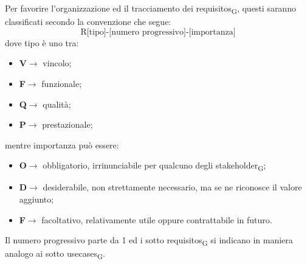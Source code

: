                 Per favorire l'organizzazione ed il tracciamento dei \glspl{requisito}\textsubscript{G}, questi saranno classificati secondo la convenzione che segue:
                $$\text{R[tipo]-[numero progressivo]-[importanza]}$$
                dove tipo è uno tra:
                \begin{itemize}
                    \item \textbf{V}$\rightarrow$ vincolo;
                    \item \textbf{F}$\rightarrow$ funzionale;
                    \item \textbf{Q}$\rightarrow$ qualità;
                    \item \textbf{P}$\rightarrow$ prestazionale;
                \end{itemize}
                mentre importanza può essere:
                \begin{itemize}
                    \item \textbf{O}$\rightarrow$ obbligatorio, irrinunciabile per qualcuno degli \gls{stakeholder}\textsubscript{G};
                    \item \textbf{D}$\rightarrow$ desiderabile, non strettamente necessario, ma se ne riconosce il valore aggiunto;
                    \item \textbf{F}$\rightarrow$ facoltativo, relativamente utile oppure contrattabile in futuro.
                \end{itemize}
                Il numero progressivo parte da 1 ed i sotto \glspl{requisito}\textsubscript{G} si indicano in maniera analogo ai sotto \glspl{usecase}\textsubscript{G}.

